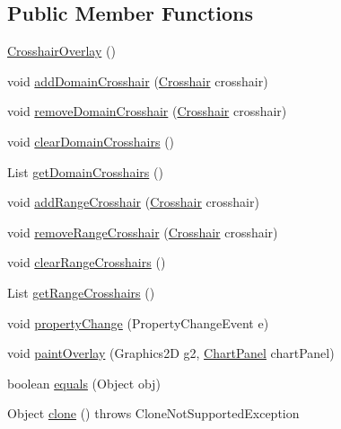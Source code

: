 \subsection*{Public Member Functions}
\begin{DoxyCompactItemize}
\item 
\mbox{\hyperlink{classorg_1_1jfree_1_1chart_1_1panel_1_1_crosshair_overlay_a80fa1f2b410c542e53c435b70aefbb9c}{Crosshair\+Overlay}} ()
\item 
void \mbox{\hyperlink{classorg_1_1jfree_1_1chart_1_1panel_1_1_crosshair_overlay_adebe4aa34a8545726d6dd708a6daf1d9}{add\+Domain\+Crosshair}} (\mbox{\hyperlink{classorg_1_1jfree_1_1chart_1_1plot_1_1_crosshair}{Crosshair}} crosshair)
\item 
void \mbox{\hyperlink{classorg_1_1jfree_1_1chart_1_1panel_1_1_crosshair_overlay_a490077421ff18c59b996fb68a6fcc8fd}{remove\+Domain\+Crosshair}} (\mbox{\hyperlink{classorg_1_1jfree_1_1chart_1_1plot_1_1_crosshair}{Crosshair}} crosshair)
\item 
void \mbox{\hyperlink{classorg_1_1jfree_1_1chart_1_1panel_1_1_crosshair_overlay_adbb4a19e547b9df6cf97c67c2826f0d0}{clear\+Domain\+Crosshairs}} ()
\item 
List \mbox{\hyperlink{classorg_1_1jfree_1_1chart_1_1panel_1_1_crosshair_overlay_ad55ad6801daa576a770fecb12d1683c7}{get\+Domain\+Crosshairs}} ()
\item 
void \mbox{\hyperlink{classorg_1_1jfree_1_1chart_1_1panel_1_1_crosshair_overlay_a646be9e4b9ab7774b97949a0c9f475a9}{add\+Range\+Crosshair}} (\mbox{\hyperlink{classorg_1_1jfree_1_1chart_1_1plot_1_1_crosshair}{Crosshair}} crosshair)
\item 
void \mbox{\hyperlink{classorg_1_1jfree_1_1chart_1_1panel_1_1_crosshair_overlay_a89a21846fbabe76c99108646640530f9}{remove\+Range\+Crosshair}} (\mbox{\hyperlink{classorg_1_1jfree_1_1chart_1_1plot_1_1_crosshair}{Crosshair}} crosshair)
\item 
void \mbox{\hyperlink{classorg_1_1jfree_1_1chart_1_1panel_1_1_crosshair_overlay_a2ab54dea5f40289c608c34333e278e3c}{clear\+Range\+Crosshairs}} ()
\item 
List \mbox{\hyperlink{classorg_1_1jfree_1_1chart_1_1panel_1_1_crosshair_overlay_a131a59a3bf5b5f8b8492d7935ab07077}{get\+Range\+Crosshairs}} ()
\item 
void \mbox{\hyperlink{classorg_1_1jfree_1_1chart_1_1panel_1_1_crosshair_overlay_aeb9b546f0672833556019b4f9c31f765}{property\+Change}} (Property\+Change\+Event e)
\item 
void \mbox{\hyperlink{classorg_1_1jfree_1_1chart_1_1panel_1_1_crosshair_overlay_a1601884f0d667eab61c224336dc87145}{paint\+Overlay}} (Graphics2D g2, \mbox{\hyperlink{classorg_1_1jfree_1_1chart_1_1_chart_panel}{Chart\+Panel}} chart\+Panel)
\item 
boolean \mbox{\hyperlink{classorg_1_1jfree_1_1chart_1_1panel_1_1_crosshair_overlay_ace709577bf4f9d6740f8fae6670da79e}{equals}} (Object obj)
\item 
Object \mbox{\hyperlink{classorg_1_1jfree_1_1chart_1_1panel_1_1_crosshair_overlay_a271ed6335b4d7f2df118b3617150a609}{clone}} ()  throws Clone\+Not\+Supported\+Exception 
\end{DoxyCompactItemize}
